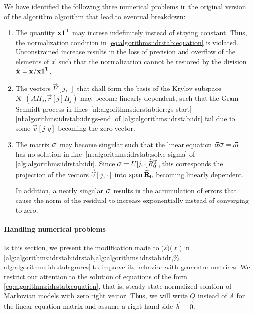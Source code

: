 We have identified the following three numerical problems in the
original version of the algorithm algorithm that lead to eventual
breakdown:
\begin{enumerate}
\item The quantity $\bm{\mathrm{x}} \bm{\mathrm{1}}^{\mathrm{T}}$ may increse indefinitely
  instead of staying constant. Thus, the normalization condition in
  \cref{eq:algorithms:idrstab:equation} is violated. Unconstrained
  increase results in the loss of precision and overflow of the
  elements of $\vec{x}$ such that the normalization cannot be restored
  by the division $\hat{\bm{\mathrm{x}}} = \bm{\mathrm{x}} / \bm{\mathrm{x}} \bm{\mathrm{1}}^{\mathrm{T}}$.
\item The vectors $\vec{V}[j, \cdot]$ that shall form the basis of the
  Krylov subspace $\mathcal{K}_s(A \Pi_j, \vec{r}[j] \Pi_j)$ may
  become linearly dependent, such that the Gram--Schmidt process in
  lines~\ref{nl:algorithms:idrstab:idr:gs-start}%
  --\ref{nl:algorithms:idrstab:idr:gs-end} of
  \cref{alg:algorithms:idrstab:idr} fail due to some $\vec{v}[j, q]$
  becoming the zero vector.
\item The matrix $\largesigma$ may become singular such that the
  linear equation $\vecarrow{\alpha} \largesigma = \vecarrow{m}$ has
  no solution in line~\ref{nl:algorithms:idrstab:solve-sigma} of
  \cref{alg:algorithms:idrstab:idr}. Since
  $\largesigma = U[j, \cdot] \widetilde{R}_0^\T$, this corresponds the
  projection of the vectors $\vec{U}[j, \cdot]$ into
  $\operatorname{span} \widetilde{\bm{\mathrm{R}}}_0$ becoming linearly dependent.

  In addition, a nearly singular $\largesigma$ results in the
  accumulation of errors that cause the norm of the residual to
  increase exponentially instead of converging to zero.
\end{enumerate}

\paragraph{Handling numerical problems}

Is this section, we present the modification made to
($s$)($\ell$) in
\cref{alg:algorithms:idrstab:idrstab,alg:algorithms:idrstab:idr,%
  alg:algorithms:idrstab:gmres} to improve its behavior with
 generator matrices. We restrict our attention to the
solution of equations of the form
\eqref{eq:algorithms:idrstab:equation}, that is, steady-state
normalized solution of Markovian models with zero right vector. Thus,
we will write $Q$ instead of $A$ for the linear equation matrix and
assume a right hand side $\vec{b} = \vec{0}$.

